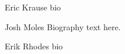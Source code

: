 \documentclass[journal]{IEEEtran}
\begin{document}
% 

\begin{IEEEbiography}{Eric Krause}
bio
\end{IEEEbiography}

\begin{IEEEbiography}{Josh Moles}
Biography text here.
\end{IEEEbiography}


\begin{IEEEbiography}{Erik Rhodes}
bio
\end{IEEEbiography}






\end{document}
